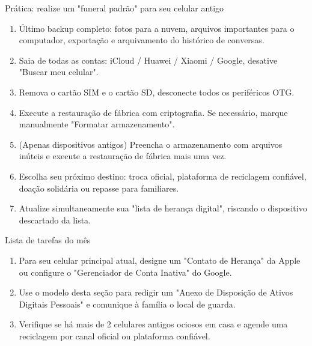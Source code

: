 \begin{tcbpractice}{Prática: realize um "funeral padrão" para seu celular antigo}
\begin{enumerate}
  \item Último backup completo: fotos para a nuvem, arquivos importantes para o computador, exportação e arquivamento do histórico de conversas.
  \item Saia de todas as contas: iCloud / Huawei / Xiaomi / Google, desative "Buscar meu celular".
  \item Remova o cartão SIM e o cartão SD, desconecte todos os periféricos OTG.
  \item Execute a restauração de fábrica com criptografia. Se necessário, marque manualmente "Formatar armazenamento".
  \item (Apenas dispositivos antigos) Preencha o armazenamento com arquivos inúteis e execute a restauração de fábrica mais uma vez.
  \item Escolha seu próximo destino: troca oficial, plataforma de reciclagem confiável, doação solidária ou repasse para familiares.
  \item Atualize simultaneamente sua "lista de herança digital", riscando o dispositivo descartado da lista.
\end{enumerate}

\end{tcbpractice}

\begin{tcbpractice}{Lista de tarefas do mês}
\begin{enumerate}
  \item Para seu celular principal atual, designe um "Contato de Herança" da Apple ou configure o "Gerenciador de Conta Inativa" do Google.
  \item Use o modelo desta seção para redigir um "Anexo de Disposição de Ativos Digitais Pessoais" e comunique à família o local de guarda.
  \item Verifique se há mais de 2 celulares antigos ociosos em casa e agende uma reciclagem por canal oficial ou plataforma confiável.
\end{enumerate}

\end{tcbpractice}
